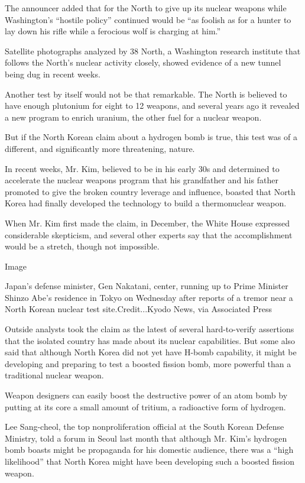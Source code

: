The announcer added that for the North to give up its nuclear weapons
while Washington's ``hostile policy'' continued would be ``as foolish as
for a hunter to lay down his rifle while a ferocious wolf is charging at
him.''

Satellite photographs analyzed by 38 North, a Washington research
institute that follows the North's nuclear activity closely, showed
evidence of a new tunnel being dug in recent weeks.

Another test by itself would not be that remarkable. The North is
believed to have enough plutonium for eight to 12 weapons, and several
years ago it revealed a new program to enrich uranium, the other fuel
for a nuclear weapon.

But if the North Korean claim about a hydrogen bomb is true, this test
was of a different, and significantly more threatening, nature.

In recent weeks, Mr. Kim, believed to be in his early 30s and determined
to accelerate the nuclear weapons program that his grandfather and his
father promoted to give the broken country leverage and influence,
boasted that North Korea had finally developed the technology to build a
thermonuclear weapon.

When Mr. Kim first made the claim, in December, the White House
expressed considerable skepticism, and several other experts say that
the accomplishment would be a stretch, though not impossible.

Image

Japan's defense minister, Gen Nakatani, center, running up to Prime
Minister Shinzo Abe's residence in Tokyo on Wednesday after reports of a
tremor near a North Korean nuclear test site.Credit...Kyodo News, via
Associated Press

Outside analysts took the claim as the latest of several hard-to-verify
assertions that the isolated country has made about its nuclear
capabilities. But some also said that although North Korea did not yet
have H-bomb capability, it might be developing and preparing to test a
boosted fission bomb, more powerful than a traditional nuclear weapon.

Weapon designers can easily boost the destructive power of an atom bomb
by putting at its core a small amount of tritium, a radioactive form of
hydrogen.

Lee Sang-cheol, the top nonproliferation official at the South Korean
Defense Ministry, told a forum in Seoul last month that although Mr.
Kim's hydrogen bomb boasts might be propaganda for his domestic
audience, there was a ``high likelihood'' that North Korea might have
been developing such a boosted fission weapon.

